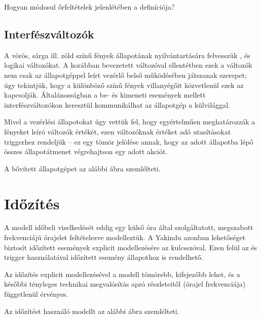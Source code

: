 \begin{feladat}
Hogyan módosul őrfeltételek jelenlétében a  definíciója?
\end{feladat}

\subsection{Interfészváltozók}

A vörös, sárga ill. zöld színű fények állapotának nyilvántartására felvesszük ,  és  logikai változókat. A korábban bevezetett  változóval ellentétben ezek a változók nem csak az állapotgéppel leírt vezérlő belső működésében játszanak szerepet; úgy tekintjük, hogy a különböző színű fények villanyégőit közvetlenül ezek az  kapcsolják. Általánosságban a be- és kimeneti események mellett interfészváltozókon keresztül kommunikálhat az állapotgép a külvilággal. 

Mivel a vezérlési állapotokat úgy vettük fel, hogy egyértelműen meghatározzák a fényeket leíró változók értékét, ezen változóknak értéket adó utasításokat  triggerhez rendeljük -- ez egy tömör jelölése annak, hogy az adott állapotba lépő összes állapotátmenet végrehajtson egy adott akciót.

A bővített állapotgépet az alábbi ábra szemlélteti.


\section{Időzítés}

A modell időbeli viselkedését eddig egy külső óra által szolgáltatott, megszabott frekvenciájú órajelet feltételezve modelleztük. A Yakindu azonban lehetőséget biztosít időzített események explicit modellezésére az  kulcsszóval. Ezen felül az  és  trigger használatával időzített esemény állapothoz is rendelhető.

Az időzítés explicit modellezésével a modell tömörebb, kifejezőbb lehet, és a későbbi tényleges technikai megvalósítás apró részleteitől (órajel frekvenciája) függetlenül érvényes. 

Az időzítést használó modellt az alábbi ábra szemlélteti.

